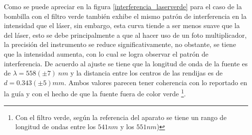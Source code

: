 \documentclass[%
 reprint,
 amsmath,amssymb,
 aps,
]{revtex4-1}
\begin{document}
{Como se puede apreciar en la figura \ref{interferencia_laserverde} para el caso de la bombilla con el filtro verde también exhibe el mismo patrón de interferencia en la intensidad que el láser, sin embargo, esta curva tiende a ser menos suave que la del láser, esto se debe principalmente a que al hacer uso de un foto multiplicador, la precisión del instrumento se reduce significativamente, no obstante, se tiene que la intensidad aumenta, con lo cual se logra observar el patrón de interferencia. De acuerdo al ajuste se tiene que la longitud de onda de la fuente es de $\lambda=558(\pm 7)\ nm$ y la distancia entre los centros de las rendijas es de $d=0.343(\pm 5) mm$. Ambos valores parecen tener coherencia con lo reportado en la guía y con el hecho de que la fuente fuera de color verde \footnote{Con el filtro verde, según la referencia \cite{guia} del aparato se tiene un rango de longitud de ondas entre los $541nm$ y los  $551 nm$)}.





}
\end{document}
